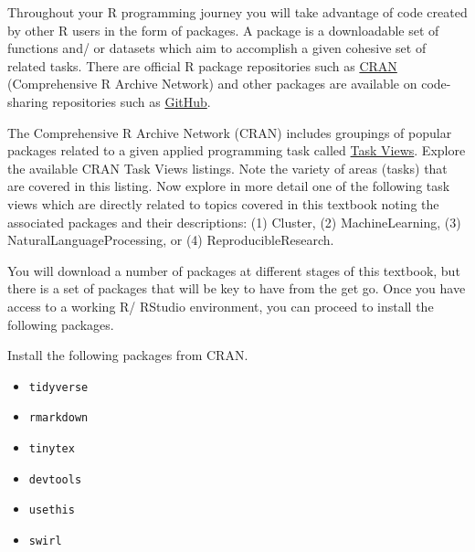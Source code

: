 \documentclass[
  letterpaper,
]{latex/krantz}
\providecommand{\tightlist}{%
  \setlength{\itemsep}{0pt}\setlength{\parskip}{0pt}}\usepackage{longtable,booktabs,array}
\begin{document}
Throughout your R programming journey you will take advantage of code
created by other R users in the form of packages. A package is a
downloadable set of functions and/ or datasets which aim to accomplish a
given cohesive set of related tasks. There are official R package
repositories such as \href{https://cran.r-project.org/}{CRAN}
(Comprehensive R Archive Network) and other packages are available on
code-sharing repositories such as \href{https://github.com/}{GitHub}.

\begin{tcolorbox}[enhanced jigsaw, opacitybacktitle=0.6, breakable, colframe=quarto-callout-note-color-frame, arc=.35mm, left=2mm, leftrule=.75mm, title=\textcolor{quarto-callout-note-color}{\faInfo}\hspace{0.5em}{Consider}, opacityback=0, colback=white, toptitle=1mm, rightrule=.15mm, titlerule=0mm, bottomtitle=1mm, bottomrule=.15mm, coltitle=black, colbacktitle=quarto-callout-note-color!10!white, toprule=.15mm]
The Comprehensive R Archive Network (CRAN) includes groupings of popular
packages related to a given applied programming task called
\href{https://cran.r-project.org/web/views/}{Task Views}. Explore the
available CRAN Task Views listings. Note the variety of areas (tasks)
that are covered in this listing. Now explore in more detail one of the
following task views which are directly related to topics covered in
this textbook noting the associated packages and their descriptions: (1)
Cluster, (2) MachineLearning, (3) NaturalLanguageProcessing, or (4)
ReproducibleResearch.
\end{tcolorbox}

You will download a number of packages at different stages of this
textbook, but there is a set of packages that will be key to have from
the get go. Once you have access to a working R/ RStudio environment,
you can proceed to install the following packages.

Install the following packages from CRAN.

\begin{itemize}
\tightlist
\item
  \texttt{tidyverse}
\item
  \texttt{rmarkdown}
\item
  \texttt{tinytex}
\item
  \texttt{devtools}
\item
  \texttt{usethis}
\item
  \texttt{swirl}
\end{itemize}
\end{document}
